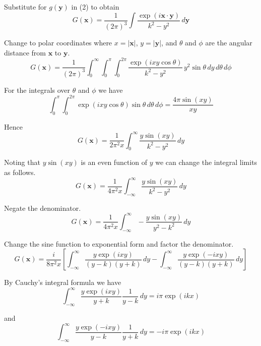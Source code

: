 Substitute for $g(\mathbf y)$ in (2) to obtain
\begin{equation*}
G(\mathbf x)=\frac{1}{(2\pi)^3}\int\frac{\exp(i\mathbf x\cdot\mathbf y)}{k^2-y^2}\,d\mathbf y
\end{equation*}

Change to polar coordinates where $x=|\mathbf x|$, $y=|\mathbf y|$,
and $\theta$ and $\phi$ are the angular distance from $\mathbf x$ to $\mathbf y$.
\begin{equation*}
G(\mathbf x)=\frac{1}{(2\pi)^3}
\int_0^\infty\int_0^\pi\int_0^{2\pi}
\frac{\exp(ixy\cos\theta)}{k^2-y^2}\,y^2\sin\theta\,dy\,d\theta\,d\phi
\end{equation*}

For the integrals over $\theta$ and $\phi$ we have
\begin{equation*}
\int_0^\pi\int_0^{2\pi}\exp(ixy\cos\theta)\sin\theta\,d\theta\,d\phi=\frac{4\pi\sin(xy)}{xy}
\end{equation*}

Hence
\begin{equation*}
G(\mathbf x)=\frac{1}{2\pi^2x}
\int_0^\infty\frac{y\sin(xy)}{k^2-y^2}\,dy
\end{equation*}

Noting that $y\sin(xy)$ is an even function of $y$ we can change the integral limits as follows.
\begin{equation*}
G(\mathbf x)=\frac{1}{4\pi^2x}
\int_{-\infty}^\infty\frac{y\sin(xy)}{k^2-y^2}\,dy
\end{equation*}

Negate the denominator.
\begin{equation*}
G(\mathbf x)=\frac{1}{4\pi^2x}
\int_{-\infty}^\infty-\frac{y\sin(xy)}{y^2-k^2}\,dy
\end{equation*}

Change the sine function to exponential form and factor the denominator.
\begin{equation*}
G(\mathbf x)
=\frac{i}{8\pi^2x}
\left[
\int_{-\infty}^\infty\frac{y\exp(ixy)}{(y-k)(y+k)}\,dy
-\int_{-\infty}^\infty\frac{y\exp(-ixy)}{(y-k)(y+k)}\,dy
\right]
\end{equation*}

By Cauchy's integral formula we have
\begin{equation*}
\int_{-\infty}^\infty\frac{y\exp(ixy)}{y+k}\frac{1}{y-k}\,dy
=i\pi\exp(ikx)
\end{equation*}

and
\begin{equation*}
\int_{-\infty}^\infty\frac{y\exp(-ixy)}{y-k}\frac{1}{y+k}\,dy
=-i\pi\exp(ikx)
\end{equation*}

